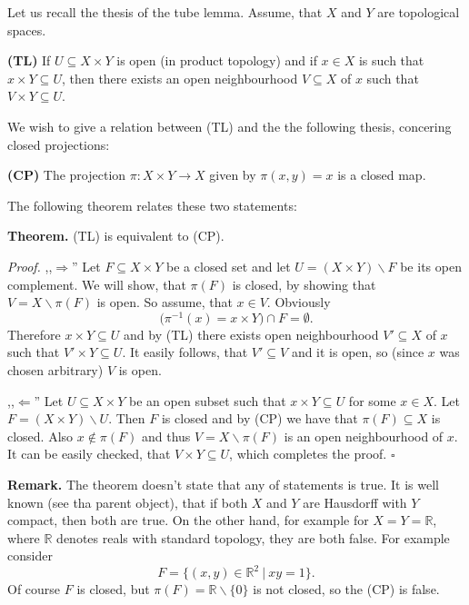 \documentclass[12pt]{article}
\begin{document}
Let us recall the thesis of the tube lemma. Assume, that $X$ and $Y$ are topological spaces.

\textbf{(TL)} If $U\subseteq X\times Y$ is open (in product topology) and if $x\in X$ is such that $x\times Y\subseteq U$, then there exists an open neighbourhood $V\subseteq X$ of $x$ such that $V\times Y\subseteq U$.

We wish to give a relation between (TL) and the the following thesis, concering closed projections:

\textbf{(CP)} The projection $\pi:X\times Y\to X$ given by $\pi(x,y)=x$ is a closed map.

The following theorem relates these two statements:

\textbf{Theorem.} (TL) is equivalent to (CP).

\textit{Proof.} ,,$\Rightarrow$'' Let $F\subseteq X\times Y$ be a closed set and let $U=(X\times Y)\backslash F$ be its open complement. We will show, that $\pi(F)$ is closed, by showing that $V=X\backslash\pi(F)$ is open. So assume, that $x\in V$. Obviously 
$$\big(\pi^{-1}(x)=x\times Y\big)\cap F=\emptyset.$$
Therefore $x\times Y\subseteq U$ and by (TL) there exists open neighbourhood $V'\subseteq X$ of $x$ such that $V'\times Y\subseteq U$. It easily follows, that $V'\subseteq V$ and it is open, so (since $x$ was chosen arbitrary) $V$ is open.

,,$\Leftarrow$'' Let $U\subseteq X\times Y$ be an open subset such that $x\times Y\subseteq U$ for some $x\in X$. Let $F=(X\times Y)\backslash U$. Then $F$ is closed and by (CP) we have that $\pi(F)\subseteq X$ is closed. Also $x\not\in\pi(F)$ and thus $V=X\backslash\pi(F)$ is an open neighbourhood of $x$. It can be easily checked, that $V\times Y\subseteq U$, which completes the proof. $\square$

\textbf{Remark.} The theorem doesn't state that any of statements is true. It is well known (see tha parent object), that if both $X$ and $Y$ are Hausdorff with $Y$ compact, then both are true. On the other hand, for example for $X=Y=\mathbb{R}$, where $\mathbb{R}$ denotes reals with standard topology, they are both false. For example consider 
$$F=\{(x,y)\in\mathbb{R}^2\ |\ xy=1\}.$$
Of course $F$ is closed, but $\pi(F)=\mathbb{R}\backslash\{0\}$ is not closed, so the (CP) is false.
\end{document}
